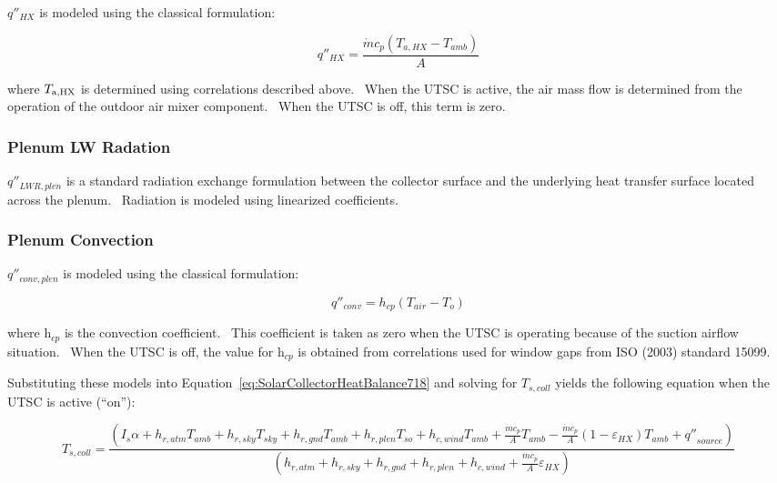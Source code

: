 \(q''_{HX}\) is modeled using the classical formulation:

\begin{equation}
{q''_{HX}} = \frac{{\dot m{c_p}({T_{a,HX}} - {T_{amb}})}}{A}
\end{equation}

where \({T_{{\rm{a,HX}}}}\) is determined using correlations described above.~ When the UTSC is active, the air mass flow is determined from the operation of the outdoor air mixer component.~ When the UTSC is off, this term is zero.

\subsubsection{Plenum LW Radation}\label{plenum-lw-radation}

\({q''_{LWR,plen}}\) is a standard radiation exchange formulation between the collector surface and the underlying heat transfer surface located across the plenum.~ Radiation is modeled using linearized coefficients.

\subsubsection{Plenum Convection}\label{plenum-convection}

\(q''_{conv,plen}\) is modeled using the classical formulation:

\begin{equation}
{q''_{conv}} = {h_{cp}}(T_{air} - T_{o})
\end{equation}

where h\(_{cp}\) is the convection coefficient.~ This coefficient is taken as zero when the UTSC is operating because of the suction airflow situation.~ When the UTSC is off, the value for h\(_{cp}\) is obtained from correlations used for window gaps from ISO (2003) standard 15099.

Substituting these models into Equation~\ref{eq:SolarCollectorHeatBalance718} and solving for \({T_{s,coll}}\) yields the following equation when the UTSC is active (``on''):

{\scriptsize
\begin{equation}
{T_{s,coll}} = \frac{{\left( {{I_s}\alpha  + {h_{r,atm}}{T_{amb}} + {h_{r,sky}}{T_{sky}} + {h_{r,gnd}}{T_{amb}} + {h_{r,plen}}{T_{so}} + {h_{c,wind}}{T_{amb}} + \frac{{\dot m{c_p}}}{A}{T_{amb}} - \frac{{\dot m{c_p}}}{A}\left( {1 - {\varepsilon_{HX}}} \right){T_{amb}} + {{q''}_{source}}} \right)}}{{\left( {{h_{r,atm}} + {h_{r,sky}} + {h_{r,gnd}} + {h_{r,plen}} + {h_{c,wind}} + \frac{{\dot m{c_p}}}{A}{\varepsilon_{HX}}} \right)}}
\end{equation}}

